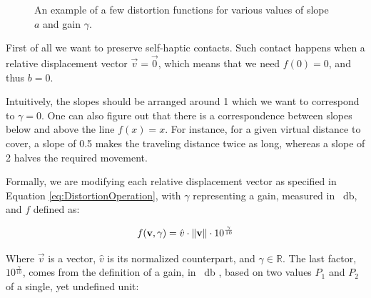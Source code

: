 \begin{figure}[h]
    \caption{An example of a few distortion functions for various values of slope $a$ and gain $\gamma $.}\label{fig:plotsOfGamma}
\end{figure}

\noindent
First of all we want to preserve self-haptic contacts. Such contact happens when a relative displacement vector $\vec{v} = \vec{0}$, which means that we need $f(0) = 0$, and thus $b = 0$.

Intuitively, the slopes should be arranged around 1 which we want to correspond to $\gamma = 0$. One can also figure out that there is a correspondence between slopes below and above the line $f(x) = x$. For instance, for a given virtual distance to cover, a slope of \num{0.5} makes the traveling distance twice as long, whereas a slope of \num{2} halves the required movement.

Formally, we are modifying each relative displacement vector as specified in Equation \ref{eq:DistortionOperation}, with $\gamma$ representing a gain, measured in \SI{}{\decibel}, and $f$ defined as:

\begin{equation}
\label{eq:DistortionFunction}
f(\mathbf{v},\gamma ) = \hat{v} \cdot \lVert\mathbf{v}\rVert \cdot 10^{\frac{\gamma}{10}}
\end{equation}

\noindent
Where $\vec{v}$ is a vector, $\hat{v}$ is its normalized counterpart, and $\gamma \in \mathbb{R}$. The last factor, $10^{\frac{\gamma}{10}}$, comes from the definition of a gain, in \SI{}{\decibel} \cite{book:decibel}, based on two values $P_1$ and $P_2$ of a single, yet undefined unit:

